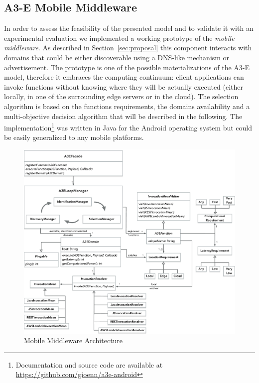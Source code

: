 \subsection{A3-E Mobile Middleware}
\label{subsec:A3-E}

In order to assess the feasibility of the presented model and to validate it with an experimental evaluation we implemented a working prototype of the \textit{mobile middleware}. As described in Section~\ref{sec:proposal} this component interacts with  domains that could be either discoverable using a DNS-like mechanism or advertisement. The prototype is one of the possible materializations of the A3-E model, therefore it embraces the computing continuum: client applications can invoke functions without knowing where they will be actually executed (either locally, in one of the surrounding edge servers or in the cloud). The selection algorithm is based on the functions requirements, the domains availability and a multi-objective decision algorithm that will be described in the following. The implementation\footnote{Documentation and source code are available at \url{https://github.com/gioenn/a3e-android}} was written in Java for the Android operating system but could be easily generalized to any mobile platforms. 
\begin{figure}[tbp]
	\includegraphics[width=1\textwidth]{figs/a3e-mobile-prototype}
	\caption{Mobile Middleware Architecture}
	\label{fig:mobile-prototype}
\end{figure}


